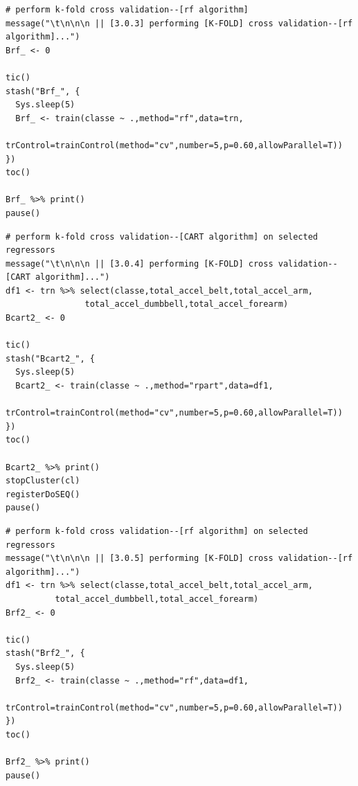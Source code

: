 \documentclass[10pt, twoside]{article}
\begin{document}
\begin{verbatim}
# perform k-fold cross validation--[rf algorithm]
message("\t\n\n\n || [3.0.3] performing [K-FOLD] cross validation--[rf algorithm]...")
Brf_ <- 0

tic()
stash("Brf_", {
  Sys.sleep(5)
  Brf_ <- train(classe ~ .,method="rf",data=trn,
          trControl=trainControl(method="cv",number=5,p=0.60,allowParallel=T))
})
toc()

Brf_ %>% print()
pause()
\end{verbatim}

\begin{verbatim}
# perform k-fold cross validation--[CART algorithm] on selected regressors
message("\t\n\n\n || [3.0.4] performing [K-FOLD] cross validation--[CART algorithm]...")
df1 <- trn %>% select(classe,total_accel_belt,total_accel_arm,
                total_accel_dumbbell,total_accel_forearm)
Bcart2_ <- 0

tic()
stash("Bcart2_", {
  Sys.sleep(5)
  Bcart2_ <- train(classe ~ .,method="rpart",data=df1,
       trControl=trainControl(method="cv",number=5,p=0.60,allowParallel=T))
})
toc()

Bcart2_ %>% print()
stopCluster(cl)
registerDoSEQ()
pause()
\end{verbatim}

\begin{verbatim}
# perform k-fold cross validation--[rf algorithm] on selected regressors
message("\t\n\n\n || [3.0.5] performing [K-FOLD] cross validation--[rf algorithm]...")
df1 <- trn %>% select(classe,total_accel_belt,total_accel_arm,
          total_accel_dumbbell,total_accel_forearm)
Brf2_ <- 0

tic()
stash("Brf2_", {
  Sys.sleep(5)
  Brf2_ <- train(classe ~ .,method="rf",data=df1,
           trControl=trainControl(method="cv",number=5,p=0.60,allowParallel=T))
})
toc()

Brf2_ %>% print()
pause()
\end{verbatim}
\end{document}
